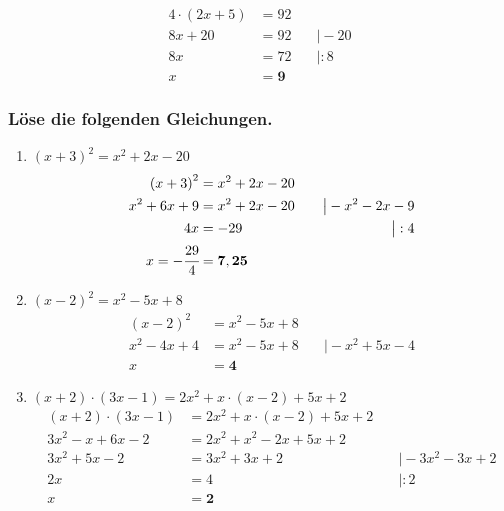 \documentclass[a4paper,10pt]{article} %
\begin{document}
\[
  \begin{aligned}
    4 \cdot (2x + 5) &= 92 \\
    8x + 20 &= 92 &\quad\big| -20 \\
    8x &= 72 &\quad\big| : 8 \\
    x &= \mathbf{9}
  \end{aligned}
\]

\subsubsection{Löse die folgenden Gleichungen.}

\begin{enumerate}[label=\alph*)]

  \item \({(x + 3)}^2 = x^2 + 2x - 20\)
  \[
    \begin{aligned}
      {(x + 3)}^2 &= x^2 + 2x - 20 \\
      x^2 + 6x + 9 &= x^2 + 2x - 20 &\quad\big| - x^2 - 2x -9 \\
      4x &= -29 &\quad\big| : 4 \\
      x = -\cfrac{29}{4} &= \mathbf{7,25}
    \end{aligned}
  \]

  \item \({(x - 2)}^2 = x^2 - 5x + 8\)
  \[
    \begin{aligned}
      {(x - 2)}^2 &= x^2 - 5x + 8 \\
      x^2 - 4x + 4 &= x^2 - 5x + 8 &\quad\big| - x^2 + 5x - 4 \\
      x &= \mathbf{4}
    \end{aligned}
  \]

  \item \((x + 2) \cdot (3x - 1) = 2x^2 + x \cdot (x - 2) + 5x + 2\)
  \[
    \begin{aligned}
      (x + 2) \cdot (3x - 1) &= 2x^2 + x \cdot (x - 2) + 5x + 2 \\
      3x^2 - x + 6x - 2 &= 2x^2 + x^2 - 2x + 5x + 2 \\
      3x^2 + 5x - 2 &= 3x^2 + 3x + 2 &\quad\big| - 3x^2 - 3x + 2 \\
      2x &= 4 &\quad\big| : 2 \\
      x &= \mathbf{2}
    \end{aligned}
  \]


\end{enumerate}
\end{document}
